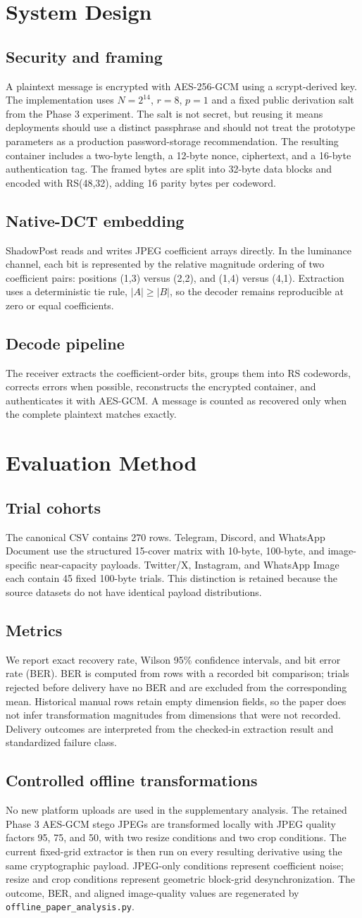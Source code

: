 \documentclass[conference]{IEEEtran}
\newcommand{\safeSection}[1]{\Needspace{5\baselineskip}\section{#1}}
\newcommand{\safeSubsection}[1]{\Needspace{4\baselineskip}\subsection{#1}}
\begin{document}
\safeSection{System Design}
\safeSubsection{Security and framing}
A plaintext message is encrypted with AES-256-GCM using a scrypt-derived key. The implementation uses $N=2^{14}$, $r=8$, $p=1$ and a fixed public derivation salt from the Phase 3 experiment. The salt is not secret, but reusing it means deployments should use a distinct passphrase and should not treat the prototype parameters as a production password-storage recommendation. The resulting container includes a two-byte length, a 12-byte nonce, ciphertext, and a 16-byte authentication tag. The framed bytes are split into 32-byte data blocks and encoded with RS(48,32), adding 16 parity bytes per codeword.

\safeSubsection{Native-DCT embedding}
ShadowPost reads and writes JPEG coefficient arrays directly. In the luminance channel, each bit is represented by the relative magnitude ordering of two coefficient pairs: positions (1,3) versus (2,2), and (1,4) versus (4,1). Extraction uses a deterministic tie rule, $|A| \geq |B|$, so the decoder remains reproducible at zero or equal coefficients.

\safeSubsection{Decode pipeline}
The receiver extracts the coefficient-order bits, groups them into RS codewords, corrects errors when possible, reconstructs the encrypted container, and authenticates it with AES-GCM. A message is counted as recovered only when the complete plaintext matches exactly.

\safeSection{Evaluation Method}
\safeSubsection{Trial cohorts}
The canonical CSV contains 270 rows. Telegram, Discord, and WhatsApp Document use the structured 15-cover matrix with 10-byte, 100-byte, and image-specific near-capacity payloads. Twitter/X, Instagram, and WhatsApp Image each contain 45 fixed 100-byte trials. This distinction is retained because the source datasets do not have identical payload distributions.

\safeSubsection{Metrics}
We report exact recovery rate, Wilson 95\% confidence intervals, and bit error rate (BER). BER is computed from rows with a recorded bit comparison; trials rejected before delivery have no BER and are excluded from the corresponding mean. Historical manual rows retain empty dimension fields, so the paper does not infer transformation magnitudes from dimensions that were not recorded. Delivery outcomes are interpreted from the checked-in extraction result and standardized failure class.

\safeSubsection{Controlled offline transformations}
No new platform uploads are used in the supplementary analysis. The retained Phase 3 AES-GCM stego JPEGs are transformed locally with JPEG quality factors 95, 75, and 50, with two resize conditions and two crop conditions. The current fixed-grid extractor is then run on every resulting derivative using the same cryptographic payload. JPEG-only conditions represent coefficient noise; resize and crop conditions represent geometric block-grid desynchronization. The outcome, BER, and aligned image-quality values are regenerated by \texttt{offline\_paper\_analysis.py}.
\end{document}
